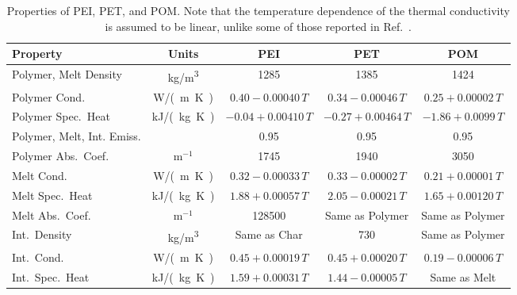 \begin{table}[!h]
\caption[Properties of PEI, PET, and POM]{Properties of PEI, PET, and POM. Note that the temperature dependence of the thermal conductivity is assumed to be linear, unlike some of those reported in Ref.~\cite{Li:Thesis}.}
\centering
\begin{tabular}{|l|c|c|c|c|}
\hline
Property                                 & Units         & PEI                     & PET                     & POM                      \\ \hline \hline
Polymer, Melt Density                    & \unit{kg/m^3}      & 1285                    & 1385                    & 1424                     \\ \hline
Polymer Cond.                            & \unit{W/(m.K)}& $0.40-0.00040 \, T$     & $0.34-0.00046  \, T$    & $0.25+0.00002 \, T$      \\ \hline
Polymer Spec.~Heat                       & \unit{kJ/(kg.K)}       & $-0.04+0.00410  \, T$   & $-0.27+0.00464  \, T$   & $-1.86+0.0099  \, T$     \\ \hline
Polymer, Melt, Int. Emiss.               &               & 0.95                    & 0.95                    & 0.95                     \\ \hline
Polymer Abs.~Coef.                       & m$^{-1}$      & 1745                    & 1940                    & 3050                     \\ \hline
Melt Cond.                               & \unit{W/(m.K)}& $0.32-0.00033 \, T$     & $0.33-0.00002 \, T$     & $0.21+0.00001 \, T$      \\ \hline
Melt Spec.~Heat                          & \unit{kJ/(kg.K)}       & $1.88+0.00057  \, T$    & $2.05-0.00021 \, T$     & $1.65+0.00120  \, T$     \\ \hline
Melt Abs.~Coef.                          & m$^{-1}$      & 128500                  & Same as Polymer         & Same as Polymer          \\ \hline
Int.~Density                             & \unit{kg/m^3}      & Same as Char            & 730                     & Same as Polymer          \\ \hline
Int.~Cond.                               & \unit{W/(m.K)}& $0.45+0.00019 \, T$     & $0.45+0.00020  \, T$    & $0.19-0.00006 \, T$      \\ \hline
Int.~Spec.~Heat                          & \unit{kJ/(kg.K)}       & $1.59+0.00031  \, T$    & $1.44-0.00005  \, T$    & Same as Melt             \\ \hline

\end{tabular}
\end{table}
